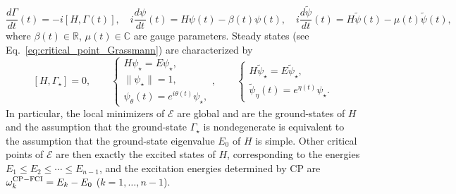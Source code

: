 \documentclass[11pt]{article}
\def\R{{\mathbb R}}
\def\C{{\mathbb C}}
\begin{document}
\begin{equation}\label{eq:dynamics_Gr_1_n}
\frac{d\Gamma}{dt}(t) = -i [H,\Gamma(t)], \quad i\frac{d\psi}{dt}(t) = H\psi(t) - \beta(t) \psi(t), \quad i\frac{d\widetilde\psi}{dt}(t) = H\widetilde\psi(t) - \mu(t) \widetilde\psi(t),
\end{equation}
where $\beta(t) \in \R$, $\mu(t) \in \C$ are gauge parameters.
Steady states (see Eq.~\eqref{eq:critical_point_Grassmann}) are characterized by
$$
[H,\Gamma_\star]=0, \qquad \left\{ \begin{array}{l} H\psi_\star = E \psi_\star, \\ \|\psi_\star\|=1, \\ \psi_\theta(t) = e^{i\theta(t)} \psi_\star, \end{array} \right., \qquad \left\{ \begin{array}{l} H\widetilde\psi_\star= E \widetilde\psi_\star, \\ \widetilde\psi_\eta(t) = e^{\eta(t)} \psi_\star. \end{array} \right. 
$$
In particular, the local minimizers of $\mathcal E$ are global and are the ground-states of $H$ and the assumption that the ground-state $\Gamma_\star$ is nondegenerate is equivalent to the assumption that the ground-state eigenvalue $E_0$ of $H$ is simple. Other critical points of $\mathcal{E}$ are then exactly the excited states of $H$, corresponding to the energies $E_1\le E_2\le\cdots\le E_{n-1}$, and the excitation energies determined by CP are $\omega^{\rm CP-FCI}_k=E_k-E_0$ ($k=1,\ldots,n-1$).

\medskip
\end{document}
